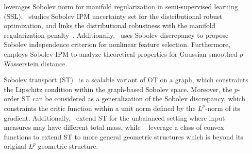 \citet{belkin2006manifold} leverages Sobolev norm for manifold regularization in semi-supervised learning (SSL).~\citet{husain2020distributional} studies Sobolev IPM uncertainty set for the distributional robust optimization, and links the distributional robustness with the manifold regularization penalty~\citep{belkin2006manifold}. Additionally,~\citet{mroueh2019sobolev_IC} uses Sobolev discrepancy to propose Sobolev independence criterion for nonlinear feature selection. Furthermore,~\citet{nietert2021smooth} employs Sobolev IPM to analyze theoretical properties for Gaussian-smoothed $p$-Wasserstein distance.


Sobolev transport (ST)~\citep{le2022st} is a scalable variant of OT on a graph, which constraints the Lipschitz condition within the graph-based Sobolev space. Moreover, the $p$-order ST can be considered as a generalization of the Sobolev discrepancy, which constraints the critic function within a unit norm defined by the $L^p$-norm of its gradient. Additionally,~\citet{le2023scalable} extend ST for the unbalanced setting where input measures may have different total mass, while ~\citet{le2024generalized} leverage a class of convex functions to extend ST to more general geometric structures which is beyond its original $L^p$-geometric structure.


